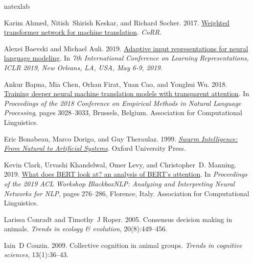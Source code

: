 \documentclass[11pt]{article}
\begin{document}
\begin{thebibliography}{49}
\expandafter\ifx\csname natexlab\endcsname\relax\def\natexlab#1{#1}\fi

Karim Ahmed, Nitish~Shirish Keskar, and Richard Socher. 2017.
\newblock \href {http://arxiv.org/abs/1711.02132} {Weighted transformer network for machine translation}.
\newblock \emph{CoRR}.

Alexei Baevski and Michael Auli. 2019.
\newblock \href {https://openreview.net/forum?id=ByxZX20qFQ} {Adaptive input representations for neural language modeling}.
\newblock In \emph{7th International Conference on Learning Representations, {ICLR} 2019, New Orleans, LA, USA, May 6-9, 2019}.

Ankur Bapna, Mia Chen, Orhan Firat, Yuan Cao, and Yonghui Wu. 2018.
\newblock \href {https://doi.org/10.18653/v1/D18-1338} {Training deeper neural machine translation models with transparent attention}.
\newblock In \emph{Proceedings of the 2018 Conference on Empirical Methods in Natural Language Processing}, pages 3028--3033, Brussels, Belgium. Association for Computational Linguistics.

Eric Bonabeau, Marco Dorigo, and Guy Theraulaz. 1999.
\newblock \href {https://doi.org/10.1093/oso/9780195131581.001.0001} {\emph{{Swarm Intelligence: From Natural to Artificial Systems}}}.
\newblock Oxford University Press.

Kevin Clark, Urvashi Khandelwal, Omer Levy, and Christopher~D. Manning. 2019.
\newblock \href {https://doi.org/10.18653/v1/W19-4828} {What does {BERT} look at? an analysis of {BERT}{'}s attention}.
\newblock In \emph{Proceedings of the 2019 ACL Workshop BlackboxNLP: Analyzing and Interpreting Neural Networks for NLP}, pages 276--286, Florence, Italy. Association for Computational Linguistics.

Larissa Conradt and Timothy~J Roper. 2005.
\newblock Consensus decision making in animals.
\newblock \emph{Trends in ecology \& evolution}, 20(8):449--456.

Iain~D Couzin. 2009.
\newblock Collective cognition in animal groups.
\newblock \emph{Trends in cognitive sciences}, 13(1):36--43.


\end{thebibliography}
\end{document}
